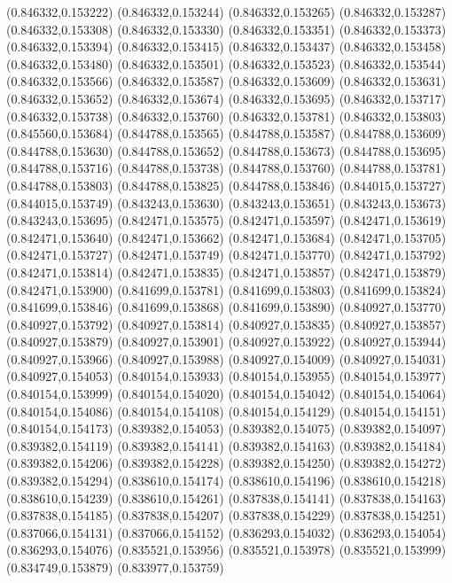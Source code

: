 (0.846332,0.153222)
(0.846332,0.153244)
(0.846332,0.153265)
(0.846332,0.153287)
(0.846332,0.153308)
(0.846332,0.153330)
(0.846332,0.153351)
(0.846332,0.153373)
(0.846332,0.153394)
(0.846332,0.153415)
(0.846332,0.153437)
(0.846332,0.153458)
(0.846332,0.153480)
(0.846332,0.153501)
(0.846332,0.153523)
(0.846332,0.153544)
(0.846332,0.153566)
(0.846332,0.153587)
(0.846332,0.153609)
(0.846332,0.153631)
(0.846332,0.153652)
(0.846332,0.153674)
(0.846332,0.153695)
(0.846332,0.153717)
(0.846332,0.153738)
(0.846332,0.153760)
(0.846332,0.153781)
(0.846332,0.153803)
(0.845560,0.153684)
(0.844788,0.153565)
(0.844788,0.153587)
(0.844788,0.153609)
(0.844788,0.153630)
(0.844788,0.153652)
(0.844788,0.153673)
(0.844788,0.153695)
(0.844788,0.153716)
(0.844788,0.153738)
(0.844788,0.153760)
(0.844788,0.153781)
(0.844788,0.153803)
(0.844788,0.153825)
(0.844788,0.153846)
(0.844015,0.153727)
(0.844015,0.153749)
(0.843243,0.153630)
(0.843243,0.153651)
(0.843243,0.153673)
(0.843243,0.153695)
(0.842471,0.153575)
(0.842471,0.153597)
(0.842471,0.153619)
(0.842471,0.153640)
(0.842471,0.153662)
(0.842471,0.153684)
(0.842471,0.153705)
(0.842471,0.153727)
(0.842471,0.153749)
(0.842471,0.153770)
(0.842471,0.153792)
(0.842471,0.153814)
(0.842471,0.153835)
(0.842471,0.153857)
(0.842471,0.153879)
(0.842471,0.153900)
(0.841699,0.153781)
(0.841699,0.153803)
(0.841699,0.153824)
(0.841699,0.153846)
(0.841699,0.153868)
(0.841699,0.153890)
(0.840927,0.153770)
(0.840927,0.153792)
(0.840927,0.153814)
(0.840927,0.153835)
(0.840927,0.153857)
(0.840927,0.153879)
(0.840927,0.153901)
(0.840927,0.153922)
(0.840927,0.153944)
(0.840927,0.153966)
(0.840927,0.153988)
(0.840927,0.154009)
(0.840927,0.154031)
(0.840927,0.154053)
(0.840154,0.153933)
(0.840154,0.153955)
(0.840154,0.153977)
(0.840154,0.153999)
(0.840154,0.154020)
(0.840154,0.154042)
(0.840154,0.154064)
(0.840154,0.154086)
(0.840154,0.154108)
(0.840154,0.154129)
(0.840154,0.154151)
(0.840154,0.154173)
(0.839382,0.154053)
(0.839382,0.154075)
(0.839382,0.154097)
(0.839382,0.154119)
(0.839382,0.154141)
(0.839382,0.154163)
(0.839382,0.154184)
(0.839382,0.154206)
(0.839382,0.154228)
(0.839382,0.154250)
(0.839382,0.154272)
(0.839382,0.154294)
(0.838610,0.154174)
(0.838610,0.154196)
(0.838610,0.154218)
(0.838610,0.154239)
(0.838610,0.154261)
(0.837838,0.154141)
(0.837838,0.154163)
(0.837838,0.154185)
(0.837838,0.154207)
(0.837838,0.154229)
(0.837838,0.154251)
(0.837066,0.154131)
(0.837066,0.154152)
(0.836293,0.154032)
(0.836293,0.154054)
(0.836293,0.154076)
(0.835521,0.153956)
(0.835521,0.153978)
(0.835521,0.153999)
(0.834749,0.153879)
(0.833977,0.153759)
